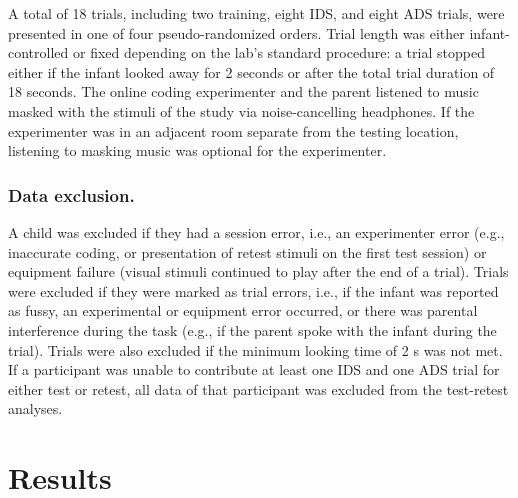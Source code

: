 \documentclass[
  man,floatsintext]{apa6}
\begin{document}
A total of 18 trials, including two training, eight IDS, and eight ADS trials, were presented in one of four pseudo-randomized orders.
Trial length was either infant-controlled or fixed depending on the lab's standard procedure: a trial stopped either if the infant looked away for 2 seconds or after the total trial duration of 18 seconds.
The online coding experimenter and the parent listened to music masked with the stimuli of the study via noise-cancelling headphones.
If the experimenter was in an adjacent room separate from the testing location, listening to masking music was optional for the experimenter.

\hypertarget{data-exclusion.}{%
\subsubsection{Data exclusion.}\label{data-exclusion.}}

A child was excluded if they had a session error, i.e., an experimenter error (e.g., inaccurate coding, or presentation of retest stimuli on the first test session) or equipment failure (visual stimuli continued to play after the end of a trial).
Trials were excluded if they were marked as trial errors, i.e., if the infant was reported as fussy, an experimental or equipment error occurred, or there was parental interference during the task (e.g., if the parent spoke with the infant during the trial).
Trials were also excluded if the minimum looking time of 2 s was not met.
If a participant was unable to contribute at least one IDS and one ADS trial for either test or retest, all data of that participant was excluded from the test-retest analyses.

\hypertarget{results}{%
\section{Results}\label{results}}
\end{document}
